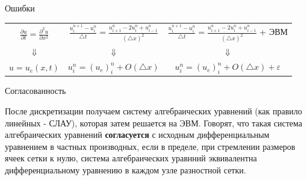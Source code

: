 \documentclass[10pt,xcolor=pst,aspectratio=169]{beamer}
\begin{document}
%
%
%

\begin{frame}{Ошибки}

    \transdissolve[duration=0.1]
    \justifying
    \large

    \begin{center}
        \begin{tabular}{|c|c|c|}
            $\frac{\partial u}{\partial t} = \frac{\partial^{2} u}{\partial x^{2}}$
            &
            $\frac{u^{n + 1}_{i} - u^{n}_{i}}{\triangle t} = \frac{u^{n}_{i + 1} - 2 u^{n}_{i} + u^{n}_{i - 1}}{\left(\triangle x\right)^{2}}$
            &
            $\frac{u^{n + 1}_{i} - u^{n}_{i}}{\triangle t} = \frac{u^{n}_{i + 1} - 2 u^{n}_{i} + u^{n}_{i - 1}}{\left(\triangle x\right)^{2}}$ + ЭВМ
            \\
            $\Downarrow$ & $\Downarrow$ & $\Downarrow$ \\
            $u = u_{e} \left( x, t\right)$ & $u^{n}_{i} = \left( u_{e} \right)^{n}_{i} + \mathit{O} \left( \triangle x \right)$ & $u^{n}_{i} = \left( u_{e} \right)^{n}_{i} + \mathit{O} \left( \triangle x \right) + \varepsilon$ \\
        \end{tabular}
    \end{center}

\end{frame}

\begin{frame}{Согласованность}

	\transdissolve[duration=0.1]
	\justifying
	\large

	После дискретизации получаем систему алгебраических уравнений (как правило линейных - СЛАУ), которая затем решается на ЭВМ. Говорят, что такая система алгебраических уравнений \textbf{согласуется} с исходным дифференциальным уравнением в частных производных, если в пределе, при стремлении размеров ячеек сетки к нулю, система алгебраических уравнний эквивалентна дифференциальному уравнению в каждом  узле разностной сетки.

\end{frame}
\end{document}
